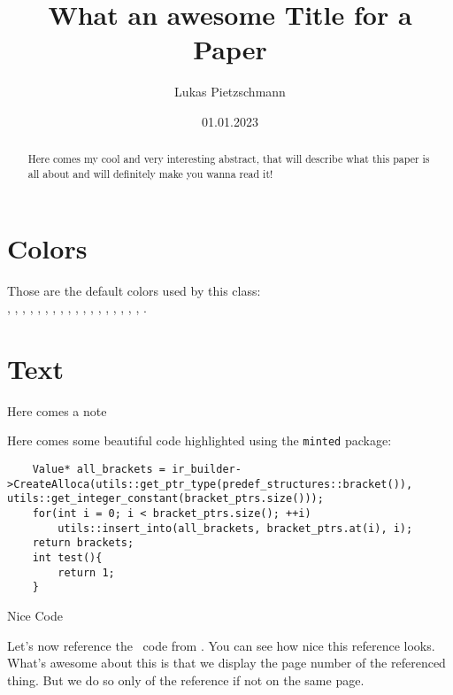 \documentclass[english, sidenote, awesomeminted]{article}
\title{What an awesome Title for a Paper}
\author{Lukas Pietzschmann}
\date{01.01.2023}
\begin{document}
\maketitle

\begin{abstract}
	Here comes my cool and very interesting abstract, that will describe what this paper is all about
	and will definitely make you wanna read it!
	\lipsum[2-3]
\end{abstract}

\tableofcontents

\emptypage
\setcounter{page}{1}

\section{Colors}
Those are the default colors used by this class:\\
, , , , , ,
, , , , , ,
, , , , , , .

\section{Text}
\lipsum[1-3]
Here comes a note
\lipsum[1]
\par
Here comes some beautiful code highlighted using the \texttt{minted} package:
\begin{listing}[H]
\begin{verbatim}
	Value* all_brackets = ir_builder->CreateAlloca(utils::get_ptr_type(predef_structures::bracket()), utils::get_integer_constant(bracket_ptrs.size()));
	for(int i = 0; i < bracket_ptrs.size(); ++i)
		utils::insert_into(all_brackets, bracket_ptrs.at(i), i);
	return brackets;
	int test(){
		return 1;
	}
\end{verbatim}
\caption{Nice Code}
\label{lst:test}
\end{listing}
\lipsum[1-4]\par
Let's now reference the \cpp~code from . You can see how nice this reference looks. What's awesome about this is that we display the page
number of the referenced thing. But we do so only of the reference if not on the same page.

\begin{appendix}
\listoflistings
\end{appendix}
\end{document}
